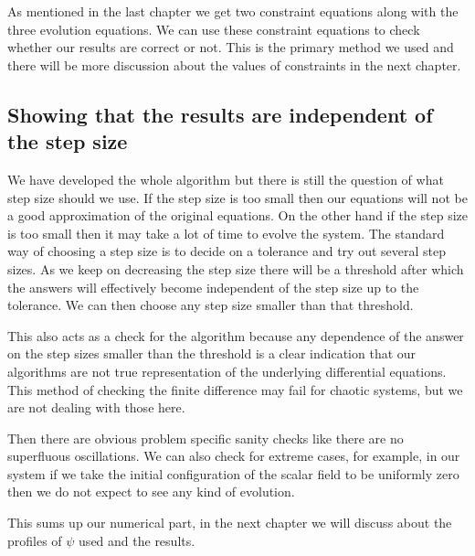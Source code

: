 As mentioned in the last chapter we get two constraint equations along with the three evolution equations. We can use these constraint equations to check whether our results are correct or not. This is the primary method we used and there will be more discussion about the values of constraints in the next chapter.


\subsection{Showing that the results are independent of the step size}

We have developed the whole algorithm but there is still the question of what step size should we use. If the step size is too small then our equations will not be a good approximation of the original equations. On the other hand if the step size is too small then it may take a lot of time to evolve the system. The standard way of choosing a step size is to decide on a tolerance and try out several step sizes. As we keep on decreasing the step size there will be a threshold after which the answers will effectively become independent of the step size up to the tolerance. We can then choose any step size smaller than that threshold.

This also acts as a check for the algorithm because any dependence of the answer on the step sizes smaller than the threshold is a clear indication that our algorithms are not true representation of the underlying differential equations.
This method of checking the finite difference may fail for chaotic systems, but we are not dealing with those here.

Then there are obvious problem specific sanity checks like there are no superfluous oscillations. We can also check for extreme cases, for example, in our system if we take the initial configuration of the scalar field to be uniformly zero then we do not expect to see any kind of evolution.






This sums up our numerical part, in the next chapter we will discuss about the profiles of $\psi$ used and the results.